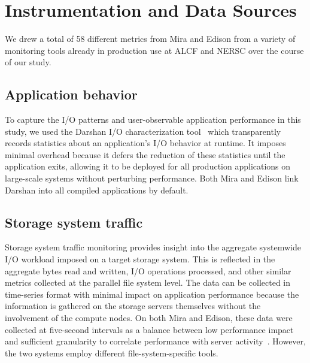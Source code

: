 \section{Instrumentation and Data Sources} \label{sec:methods}

We drew a total of 58 different metrics from Mira and Edison from a variety
of monitoring tools already in production use at ALCF and NERSC over the
course of our study.

\subsection{Application behavior} \label{sec:methods/darshan}

To capture the I/O patterns and user-observable application performance in this study, we used the Darshan I/O characterization tool~\cite{carns200924} which transparently records statistics about an application's I/O behavior at runtime.
It imposes minimal overhead because it defers the reduction of these statistics until the application exits,
allowing it to be deployed for all production applications on large-scale systems without perturbing performance.  Both Mira and Edison link Darshan into all compiled applications by default.

\subsection{Storage system traffic} \label{sec:methods/storagesystraffic}

Storage system traffic monitoring provides insight into the aggregate systemwide I/O workload imposed on a target storage system.
This is reflected in the aggregate bytes read and written, I/O operations processed, and other similar metrics collected at the parallel file system level.
The data can be collected in time-series format with minimal impact on application performance because the information is gathered on the storage servers themselves without the involvement of the compute nodes.
On both Mira and Edison, these data were collected at five-second intervals as a balance between low performance impact and sufficient granularity to correlate performance with server activity~\cite{madireddy2017}.  However, the two systems employ different file-system-specific tools.  

